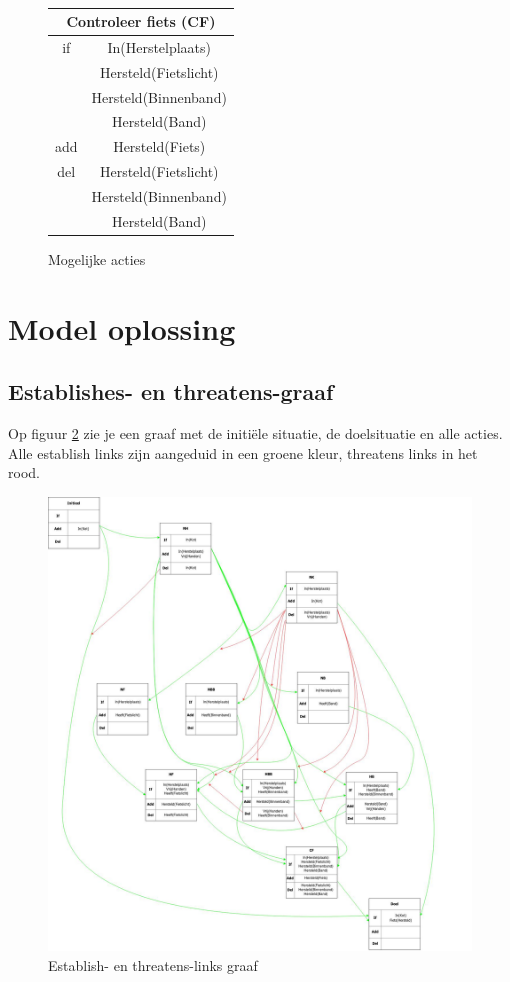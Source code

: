 \documentclass{article}
\begin{document}
\begin{figure}[H]
\\\vspace{0.25cm}
\begin{tabular}{|c|c|}
    \multicolumn{2}{c}{Controleer fiets (CF)}\\
    \hline
    if & In(Herstelplaats)\\
       & Hersteld(Fietslicht)\\
       & Hersteld(Binnenband)\\
       & Hersteld(Band)\\
    \hline
    add & Hersteld(Fiets)\\
    \hline
    del & Hersteld(Fietslicht)\\
        & Hersteld(Binnenband)\\
        & Hersteld(Band)\\
    \hline
\end{tabular}
\caption{Mogelijke acties}
\label{acties}
\end{figure}

\newpage
\section{Model oplossing}

\subsection{Establishes- en threatens-graaf}

Op figuur \ref{E_T_Graaf} zie je een graaf met de initiële situatie, de doelsituatie en alle acties. Alle establish links zijn aangeduid in een groene kleur, threatens links in het rood.

\begin{figure}[H]
\centering
\caption{Establish- en threatens-links graaf}
\label{E_T_Graaf}
\includegraphics[scale=0.2791]{Est_Thr_Graaf.jpg}
\end{figure}
\end{document}
